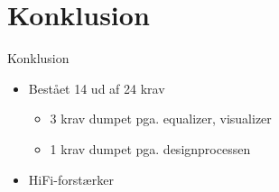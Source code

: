 \section{Konklusion}
\begin{frame}{Konklusion}

\begin{itemize}
\item<1-> Bestået 14 ud af 24 krav
\begin{itemize}
\item<1-> 3 krav dumpet pga. equalizer, visualizer
\item<1-> 1 krav dumpet pga. designprocessen
\end{itemize}
\item<2-> \textcolor{light-gray}{HiFi-}forstærker
\end{itemize}

\end{frame}